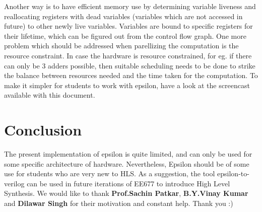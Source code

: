 \documentclass[titlepage]{article}
\begin{document}
        Another way is to have efficient memory use by determining variable liveness and reallocating registers with dead variables (variables which are not accessed in future) to other newly live variables. Variables are bound to specific registers for their lifetime, which can be figured out from the control flow graph. One more problem which should be addressed when parellizing the computation is the resource constraint. In case the hardware is resource constrained, for eg. if there can only be 3 adders possible, then suitable scheduling needs to be done to strike the balance between resources needed and the time taken for the computation.
    To make it simpler for students to work with epsilon, have a look at the screencast available with this document.

    \section{Conclusion}
    The present implementation of epsilon is quite limited, and can only be used for some
    specific architecture of hardware. Nevertheless, Epsilon should be of some use for students who are very new to HLS.
    As a suggestion, the tool epsilon-to-verilog can be used in future iterations of EE677 to introduce High Level Synthesis. 
    We would like to thank \textbf{Prof.Sachin Patkar}, \textbf{B.Y.Vinay Kumar} and \textbf{Dilawar Singh} for their motivation and constant help. Thank you :)
\end{document}
